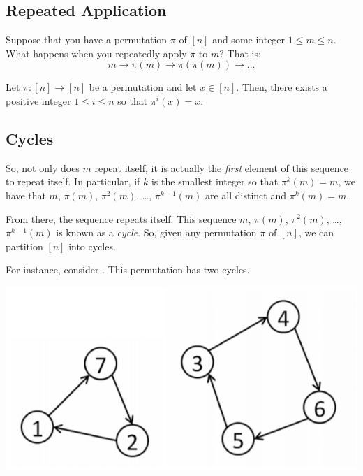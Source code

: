 \documentclass[letterpaper]{article}
\begin{document}
\subsection{Repeated Application}
Suppose that you have a permutation $\pi$ of $[n]$ and some integer $1 \leq m \leq n$. What happens when you repeatedly apply $\pi$ to $m$? That is:
\[m \to \pi(m) \to \pi(\pi(m)) \to \dots\]
\begin{lemma}{}{}
    Let $\pi: [n] \to [n]$ be a permutation and let $x \in [n]$. Then, there exists a positive integer $1 \leq i \leq n$ so that $\pi^{i}(x) = x$. 
\end{lemma}

\subsection{Cycles}
So, not only does $m$ repeat itself, it is actually the \emph{first} element of this sequence to repeat itself. In particular, if $k$ is the smallest integer so that $\pi^{k}(m) = m$, we have that $m$, $\pi(m)$, $\pi^{2}(m)$, \dots, $\pi^{k - 1}(m)$ are all distinct and $\pi^{k}(m) = m$.

\bigskip 

From there, the sequence repeats itself. This sequence $m$, $\pi(m)$, $\pi^{2}(m)$, \dots, $\pi^{k - 1}(m)$ is known as a \emph{cycle}. So, given any permutation $\pi$ of $[n]$, we can partition $[n]$ into cycles. 

\bigskip 

For instance, consider . This permutation has two cycles.
\begin{center}
    \includegraphics[scale=0.5]{img/ex_cycle.PNG}
\end{center}

\bigskip 
\end{document}
